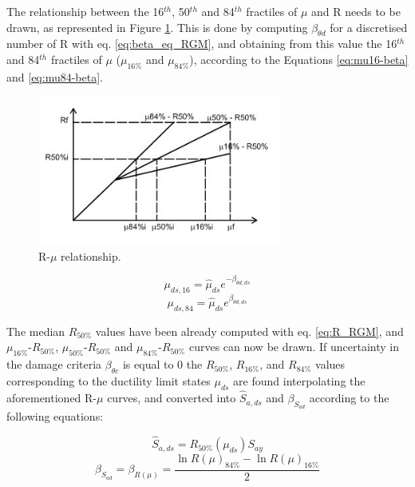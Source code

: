 The relationship between the 16$^{th}$, 50$^{th}$ and 84$^{th}$ fractiles of $\mu$ and R needs to be drawn, as represented in Figure \ref{fig:Rmu}. This is done by computing $\beta_{\theta d}$ for a discretised number of R with eq. \ref{eq:beta_eq_RGM}, and obtaining from this value the 16$^{th}$ and 84$^{th}$ fractiles of $\mu$ ($\mu_{16\%}$ and $\mu_{84\%}$), according to the Equations \ref{eq:mu16-beta} and \ref{eq:mu84-beta}.

\begin{figure}[!htbp]
\centering
\includegraphics[width=8cm]{./figures/Rmu.jpg}
\caption{R-$\mu$ relationship.}
\label{fig:Rmu}
\end{figure}

\begin{equation}
\mu_{ds,16} = \hat{\mu}_{ds} e^{-\beta_{\theta d,ds}}
\label{eq:mu16-beta}
\end{equation}
\begin{equation}
\mu_{ds,84} = \hat{\mu}_{ds} e^{\beta_{\theta d,ds}}
\label{eq:mu84-beta}
\end{equation}

The median $R_{50\%}$ values have been already computed with eq. \ref{eq:R_RGM}, and $\mu_{16\%}$-$R_{50\%}$, $\mu_{50\%}$-$R_{50\%}$ and $\mu_{84\%}$-$R_{50\%}$ curves can now be drawn.
If uncertainty in the damage criteria $\beta_{\theta c}$ is equal to 0 the $R_{50\%}$, $R_{16\%}$, and $R_{84\%}$ values corresponding to the ductility limit states $\mu_{ds}$ are found interpolating the aforementioned R-$\mu$ curves, and converted into $\hat{S}_{a,ds}$ and $\beta_{S_{a d}}$ according to the following equations:

\begin{equation}
\hat{S}_{a,ds} = R_{50\%}(\mu_{ds}) S_{ay}
\label{eq:SaR}
\end{equation}
\begin{equation}
\beta_{S_{a d}} = \beta_{R(\mu)} = \frac{\ln R(\mu)_{84\%} - \ln R(\mu)_{16\%}}{2}
\label{eq:betaR}
\end{equation} 

